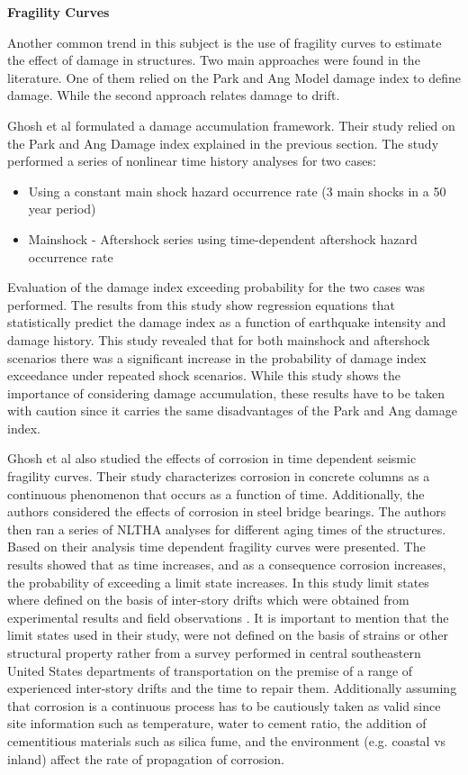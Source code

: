 \textbf{Fragility Curves}

Another common trend in this subject is the use of fragility curves to estimate the effect of damage in structures. Two main approaches were found in the literature. One of them relied on the Park and Ang Model damage index to define damage. While the second approach relates damage to drift.

Ghosh et al \cite{Ghosh2015} formulated a damage accumulation framework. Their study relied on the Park and Ang Damage index explained in the previous section. The study performed a series of nonlinear time history analyses for two cases:

\begin{itemize}
	\item Using a constant main shock hazard occurrence rate (3 main shocks in a 50 year period)
	\item Mainshock - Aftershock series using time-dependent aftershock hazard occurrence rate
\end{itemize}

Evaluation of the damage index exceeding probability for the two cases was performed. The results from this study show regression equations that statistically predict the damage index as a function of earthquake intensity and damage history. This study revealed that for both mainshock and aftershock scenarios there was a significant increase in the probability of damage index exceedance under repeated shock scenarios. While this study shows the importance of considering damage accumulation, these results have to be taken with caution since it carries the same disadvantages of the Park and Ang damage index.

Ghosh et al \cite{Ghosh2010} also studied the effects of corrosion in time dependent seismic fragility curves. Their study characterizes corrosion in concrete columns as a continuous phenomenon that occurs as a function of time. Additionally, the authors considered the effects of corrosion in steel bridge bearings. The authors then ran a series of NLTHA analyses for different aging times of the structures. Based on their analysis time dependent fragility curves were presented. The results showed that as time increases, and as a consequence corrosion increases, the probability of exceeding a limit state increases. In this study limit states where defined on the basis of inter-story drifts which were obtained from experimental results and field observations \cite{Padgett2007}. It is important to mention that the limit states used in their study, were not defined on the basis of strains or other structural property rather from a survey performed in central southeastern United States departments of transportation on the premise of a range of experienced inter-story drifts and the time to repair them. Additionally assuming that corrosion is a continuous process has to be cautiously taken as valid since site information such as temperature, water to cement ratio, the addition of cementitious materials such as silica fume, and the environment (e.g. coastal vs inland) affect the rate of propagation of corrosion\cite{Thoft-Christensen}.

